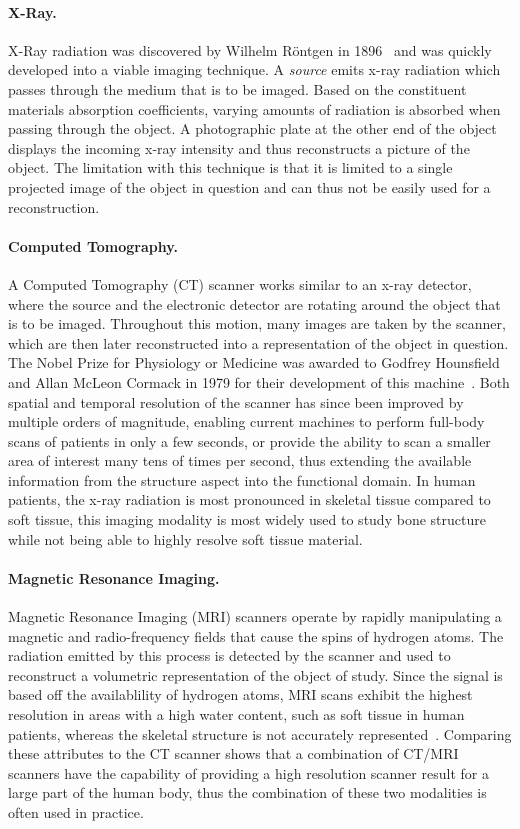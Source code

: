 \paragraph{X-Ray. } X-Ray radiation was discovered by Wilhelm R\"ontgen in 1896~\cite{Rontgen1896xray} and was quickly developed into a viable imaging technique.  A \emph{source} emits x-ray radiation which passes through the medium that is to be imaged.  Based on the constituent materials absorption coefficients, varying amounts of radiation is absorbed when passing through the object.  A photographic plate at the other end of the object displays the incoming x-ray intensity and thus reconstructs a picture of the object.  The limitation with this technique is that it is limited to a single  projected image of the object in question and can thus not be easily used for a  reconstruction.

\paragraph{Computed Tomography. }  A Computed Tomography (CT) scanner works similar to an x-ray detector, where the source and the electronic detector are rotating around the object that is to be imaged.  Throughout this motion, many images are taken by the scanner, which are then later reconstructed into a  representation of the object in question.  The Nobel Prize for Physiology or Medicine was awarded to Godfrey Hounsfield and Allan McLeon Cormack in 1979 for their development of this machine~\cite{Hounsfield1980computed}.  Both spatial and temporal resolution of the scanner has since been improved by multiple orders of magnitude, enabling current machines to perform full-body scans of patients in only a few seconds, or provide the ability to scan a smaller area of interest many tens of times per second, thus extending the available information from the structure aspect into the functional domain.  In human patients, the x-ray radiation is most pronounced in skeletal tissue compared to soft tissue, this imaging modality is most widely used to study bone structure while not being able to highly resolve soft tissue material.

\paragraph{Magnetic Resonance Imaging. }  Magnetic Resonance Imaging (MRI) scanners operate by rapidly manipulating a magnetic and radio-frequency fields that cause the spins of hydrogen atoms.  The radiation emitted by this process is detected by the scanner and used to reconstruct a  volumetric representation of the object of study.  Since the signal is based off the availablility of hydrogen atoms, MRI scans exhibit the highest resolution in areas with a high water content, such as soft tissue in human patients, whereas the skeletal structure is not accurately represented~\cite{damadian1971tumor}.  Comparing these attributes to the CT scanner shows that a combination of CT/MRI scanners have the capability of providing a high resolution scanner result for a large part of the human body, thus the combination of these two modalities is often used in practice.

